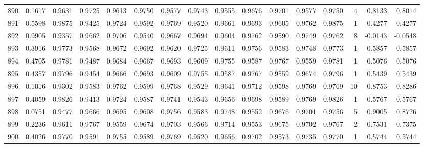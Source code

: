 \begin{tabular}{lrrrrrrrrrrrrrrr}
890 &      0.1617 &  0.9631 &  0.9725 &  0.9613 &  0.9750 &  0.9577 &  0.9743 &  0.9555 &  0.9676 &  0.9701 &   0.9577 &     0.9750 &      4 &                    0.8133 &                     0.8014 \\
891 &      0.5598 &  0.9875 &  0.9425 &  0.9724 &  0.9592 &  0.9769 &  0.9520 &  0.9661 &  0.9693 &  0.9605 &   0.9762 &     0.9875 &      1 &                    0.4277 &                     0.4277 \\
892 &      0.9905 &  0.9357 &  0.9662 &  0.9706 &  0.9540 &  0.9667 &  0.9694 &  0.9604 &  0.9762 &  0.9590 &   0.9749 &     0.9762 &      8 &                   -0.0143 &                    -0.0548 \\
893 &      0.3916 &  0.9773 &  0.9568 &  0.9672 &  0.9692 &  0.9620 &  0.9725 &  0.9611 &  0.9756 &  0.9583 &   0.9748 &     0.9773 &      1 &                    0.5857 &                     0.5857 \\
894 &      0.4705 &  0.9781 &  0.9487 &  0.9684 &  0.9667 &  0.9693 &  0.9609 &  0.9755 &  0.9587 &  0.9767 &   0.9559 &     0.9781 &      1 &                    0.5076 &                     0.5076 \\
895 &      0.4357 &  0.9796 &  0.9454 &  0.9666 &  0.9693 &  0.9609 &  0.9755 &  0.9587 &  0.9767 &  0.9559 &   0.9674 &     0.9796 &      1 &                    0.5439 &                     0.5439 \\
896 &      0.1016 &  0.9302 &  0.9583 &  0.9762 &  0.9599 &  0.9768 &  0.9529 &  0.9641 &  0.9712 &  0.9598 &   0.9769 &     0.9769 &     10 &                    0.8753 &                     0.8286 \\
897 &      0.4059 &  0.9826 &  0.9413 &  0.9724 &  0.9587 &  0.9741 &  0.9543 &  0.9656 &  0.9698 &  0.9589 &   0.9769 &     0.9826 &      1 &                    0.5767 &                     0.5767 \\
898 &      0.0751 &  0.9477 &  0.9666 &  0.9695 &  0.9608 &  0.9756 &  0.9583 &  0.9748 &  0.9552 &  0.9676 &   0.9701 &     0.9756 &      5 &                    0.9005 &                     0.8726 \\
899 &      0.2236 &  0.9611 &  0.9767 &  0.9559 &  0.9674 &  0.9703 &  0.9566 &  0.9714 &  0.9553 &  0.9675 &   0.9702 &     0.9767 &      2 &                    0.7531 &                     0.7375 \\
900 &      0.4026 &  0.9770 &  0.9591 &  0.9755 &  0.9589 &  0.9769 &  0.9520 &  0.9656 &  0.9702 &  0.9573 &   0.9735 &     0.9770 &      1 &                    0.5744 &                     0.5744 \\

\end{tabular}
